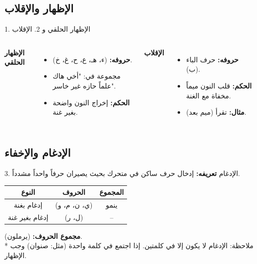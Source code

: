 \documentclass[aspectratio=169, 12pt]{beamer}
\begin{document}
\subsection{الإظهار والإقلاب}
\begin{frame}{1. الإظهار الحلقي و 2. الإقلاب}
    \begin{columns}
        \textbf{الإظهار الحلقي}
        \begin{itemize}
            \item \textbf{حروفه:} (ء، هـ، ع، ح، غ، خ).
            \item مجموعة في: "أخي هاك علماً حازه غير خاسر".
            \item \textbf{الحكم:} إخراج النون واضحة بغير غنة.
        \end{itemize}

        \textbf{الإقلاب}
        \begin{itemize}
            \item \textbf{حروفه:} حرف الباء (ب).
            \item \textbf{الحكم:} قلب النون ميماً مخفاة مع الغنة.
            \item \textbf{مثال:}  تقرأ (ميم بعد).
        \end{itemize}
    \end{columns}
\end{frame}

\subsection{الإدغام والإخفاء}
\begin{frame}{3. الإدغام}
    \textbf{تعريفه:} إدخال حرف ساكن في متحرك بحيث يصيران حرفاً واحداً مشدداً.
    \vspace{0.3cm}
    \begin{table}
        \centering
        \begin{tabular}{|c|c|c|}
            \hline
            \textbf{النوع} & \textbf{الحروف} & \textbf{المجموع} \\
            \hline
            إدغام بغنة & (ي، ن، م، و) & ينمو \\
            \hline
            إدغام بغير غنة & (ل، ر) & -- \\
            \hline
        \end{tabular}
    \end{table}
    \textbf{مجموع الحروف:} (يرملون).
    \\ \small{* ملاحظة: الإدغام لا يكون إلا في كلمتين. إذا اجتمع في كلمة واحدة (مثل: صنوان) وجب الإظهار.}
\end{frame}
\end{document}
